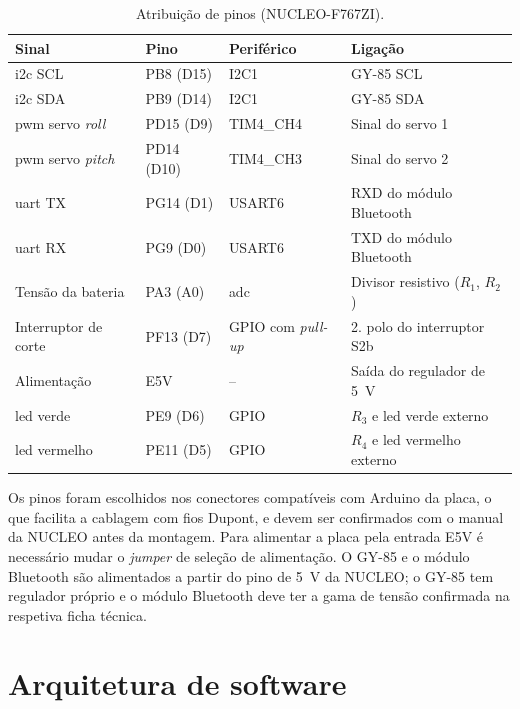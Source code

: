 \begin{table}[H]
\centering\small
\caption{Atribuição de pinos (NUCLEO-F767ZI).}
\begin{tabularx}{\textwidth}{>{\raggedright\arraybackslash}p{3.4cm}>{\raggedright\arraybackslash}p{2.6cm}>{\raggedright\arraybackslash}p{2.8cm}Y}
\toprule
Sinal & Pino & Periférico & Ligação\\\midrule
\acrshort{i2c} SCL & PB8 (D15) & I2C1 & GY-85 SCL\\
\acrshort{i2c} SDA & PB9 (D14) & I2C1 & GY-85 SDA\\
\acrshort{pwm} servo \textit{roll} & PD15 (D9) & TIM4\_CH4 & Sinal do servo 1\\
\acrshort{pwm} servo \textit{pitch} & PD14 (D10) & TIM4\_CH3 & Sinal do servo 2\\
\acrshort{uart} TX & PG14 (D1) & USART6 & RXD do módulo Bluetooth\\
\acrshort{uart} RX & PG9 (D0) & USART6 & TXD do módulo Bluetooth\\
Tensão da bateria & PA3 (A0) & \acrshort{adc} & Divisor resistivo ($R_1$, $R_2$)\\
Interruptor de corte & PF13 (D7) & GPIO com \textit{pull-up} & 2.\textordmasculine{} polo do interruptor S2b\\
Alimentação & E5V & -- & Saída do regulador de \SI{5}{\volt}\\
\acrshort{led} verde & PE9 (D6) & GPIO & $R_3$ e \acrshort{led} verde externo\\
\acrshort{led} vermelho & PE11 (D5) & GPIO & $R_4$ e \acrshort{led} vermelho externo\\
\bottomrule
\end{tabularx}
\label{tab:pinos}
\end{table}

Os pinos foram escolhidos nos conectores compatíveis com Arduino da placa, o que facilita a cablagem com fios Dupont, e devem ser confirmados com o manual da NUCLEO antes da montagem. Para alimentar a placa pela entrada E5V é necessário mudar o \textit{jumper} de seleção de alimentação. O GY-85 e o módulo Bluetooth são alimentados a partir do pino de \SI{5}{\volt} da NUCLEO; o GY-85 tem regulador próprio e o módulo Bluetooth deve ter a gama de tensão confirmada na respetiva ficha técnica.

\section{Arquitetura de software}

